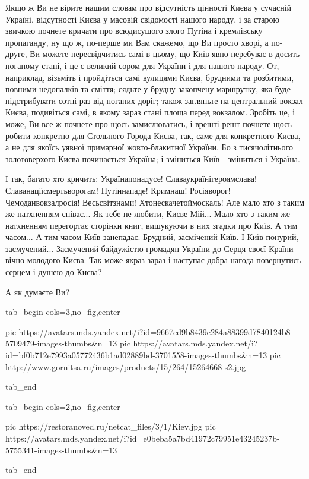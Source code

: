 Якщо ж Ви не вірите нашим словам про відсутність цінності Києва у сучасній
Україні, відсутності Києва у масовій свідомості нашого народу, і за старою
звичкою почнете кричати про всюдисущого злого Путіна і кремлівську пропаганду,
ну що ж, по-перше ми Вам скажемо, що Ви просто хворі, а по-друге, Ви можете
пересвідчитись самі в цьому, що Київ явно перебуває в досить поганому стані, і
це є великий сором для України і для нашого народу. От, наприклад, візьміть і
пройдіться самі вулицями Києва, брудними та розбитими, повними недопалків та
сміття; сядьте у брудну закопчену маршрутку, яка буде підстрибувати сотні раз
від поганих доріг; також загляньте на центральний вокзал Києва, подивіться
самі, в якому зараз стані площа перед вокзалом.  Зробіть це, і може, Ви все ж
почнете про щось замислюватись, і врешті-решт почнете щось робити конкретно для
Стольного Города Києва, так, саме для конкретного Києва, а не для якоїсь уявної
примарної жовто-блакитної України. Бо з тисячолітнього золотоверхого Києва
починається Україна; і зміниться Київ - зміниться і Україна.

І так, багато хто кричить: Українапонадусе! Славаукраїнігероямслава!
Славанаціїсмертьворогам! Путіннападе! Кримнаш! Росіяворог!
Чемоданвокзалросія!  Весьсвітзнами! Хтонескачетоймоскаль! Але мало хто з таким
же натхненням співає... Як тебе не любити, Києве Мій... Мало хто з таким же
натхненням перегортає сторінки книг, вишукуючи в них згадки про Київ.  А тим
часом... А тим часом Київ занепадає.  Брудний, засмічений Київ. І Київ понурий,
засмучений... Засмучений байдужістю громадян України до Серця своєї Країни -
вічно молодого Києва. Так може якраз зараз і наступає добра нагода повернутись
серцем і душею до Києва?

А як думаєте Ви?

\ifcmt
  tab_begin cols=3,no_fig,center

		 pic https://avatars.mds.yandex.net/i?id=9667cd9b8439e284a88399d7840124b8-5709479-images-thumbs&n=13
     pic https://avatars.mds.yandex.net/i?id=bf0b712e7993a05772436b1ad02889bd-3701558-images-thumbs&n=13
		 pic http://www.gornitsa.ru/images/products/15/264/15264668-s2.jpg

  tab_end
\fi


\ifcmt
  tab_begin cols=2,no_fig,center

     pic https://restoranoved.ru/netcat_files/3/1/Kiev.jpg
		 pic https://avatars.mds.yandex.net/i?id=e0beba5a7bd41972c79951e43245237b-5755341-images-thumbs&n=13

  tab_end
\fi


